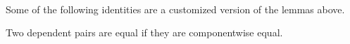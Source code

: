 \begin{code}%
\>[0]\<%
\\
\>[0][@{}l@{\AgdaIndent{0}}]%
\>[2]\AgdaSymbol{:}\AgdaSpace{}%
\AgdaSymbol{\{}\AgdaSpace{}%
\AgdaSymbol{:}\AgdaSpace{}%
\AgdaSpace{}%
\AgdaSymbol{\}}\AgdaSpace{}%
\AgdaSymbol{\{}\AgdaSpace{}%
\AgdaSymbol{:}\AgdaSpace{}%
\AgdaSpace{}%
\AgdaSpace{}%
\AgdaSpace{}%
\AgdaSymbol{\}}\AgdaSpace{}%
\AgdaSymbol{\{}\AgdaSpace{}%
\AgdaSymbol{:}\AgdaSpace{}%
\AgdaSpace{}%
\AgdaSpace{}%
\AgdaSpace{}%
\AgdaSymbol{\}}\<%
\\
%
\>[2]\AgdaSpace{}%
\AgdaSpace{}%
\AgdaSpace{}%
\AgdaSpace{}%
\AgdaSpace{}%
\AgdaSpace{}%
\AgdaSpace{}%
\AgdaSpace{}%
\AgdaSymbol{)}\<%
\\
%
\>[2]\AgdaComment{--------------------}\<%
\\
%
\>[2]\AgdaSpace{}%
\AgdaSpace{}%
\AgdaSpace{}%
\AgdaSpace{}%
\AgdaSpace{}%
\AgdaSpace{}%
\AgdaSpace{}%
\<%
\\
%
\\[\AgdaEmptyExtraSkip]%
\>[0]\AgdaSpace{}%
\AgdaSpace{}%
\AgdaSymbol{=}\AgdaSpace{}%
\AgdaSpace{}%
\AgdaSpace{}%
\<%
\end{code}

Some of the following identities are a customized version of the lemmas above.

\begin{code}%
\>[0]\AgdaSpace{}%
\AgdaSpace{}%
\AgdaSymbol{\{}\AgdaSpace{}%
\AgdaSymbol{\}}\AgdaSpace{}%
\AgdaSymbol{\{}\AgdaSpace{}%
\AgdaSymbol{:}\AgdaSpace{}%
\AgdaSpace{}%
\AgdaSymbol{\}}\AgdaSpace{}%
\AgdaSymbol{\{}\AgdaSpace{}%
\AgdaSymbol{:}\AgdaSpace{}%
\AgdaSpace{}%
\AgdaSpace{}%
\AgdaSpace{}%
\AgdaSymbol{\}}\AgdaSpace{}%
\<%
\end{code}

Two dependent pairs are equal if they are componentwise equal.

